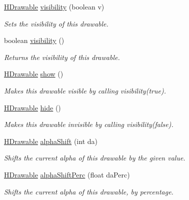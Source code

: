 \begin{DoxyCompactItemize}
\hyperlink{classhype_1_1drawable_1_1_h_drawable}{H\-Drawable} \hyperlink{classhype_1_1drawable_1_1_h_drawable_a6417fd46b70ffc329969f6c492f652e4}{visibility} (boolean v)
\begin{DoxyCompactList}\small\item\em Sets the visibility of this drawable. \end{DoxyCompactList}\item 
boolean \hyperlink{classhype_1_1drawable_1_1_h_drawable_aa79392f2459864795224477e941618cc}{visibility} ()
\begin{DoxyCompactList}\small\item\em Returns the visibility of this drawable. \end{DoxyCompactList}\item 
\hyperlink{classhype_1_1drawable_1_1_h_drawable}{H\-Drawable} \hyperlink{classhype_1_1drawable_1_1_h_drawable_a5b8fa14e65c5728b24f8f3eb0c64607a}{show} ()
\begin{DoxyCompactList}\small\item\em Makes this drawable visible by calling {\ttfamily visibility(true)}. \end{DoxyCompactList}\item 
\hyperlink{classhype_1_1drawable_1_1_h_drawable}{H\-Drawable} \hyperlink{classhype_1_1drawable_1_1_h_drawable_adc8b09823e0c47cf1e72df0820dad1e3}{hide} ()
\begin{DoxyCompactList}\small\item\em Makes this drawable invisible by calling {\ttfamily visibility(false)}. \end{DoxyCompactList}\item 
\hyperlink{classhype_1_1drawable_1_1_h_drawable}{H\-Drawable} \hyperlink{classhype_1_1drawable_1_1_h_drawable_acf22a86de606bdd313d4d45e6615a6ae}{alpha\-Shift} (int da)
\begin{DoxyCompactList}\small\item\em Shifts the current alpha of this drawable by the given value. \end{DoxyCompactList}\item 
\hyperlink{classhype_1_1drawable_1_1_h_drawable}{H\-Drawable} \hyperlink{classhype_1_1drawable_1_1_h_drawable_a8a62af5b97563ca02a2b1d6824e6cc75}{alpha\-Shift\-Perc} (float da\-Perc)
\begin{DoxyCompactList}\small\item\em Shifts the current alpha of this drawable, by percentage. \end{DoxyCompactList}\item 

\end{DoxyCompactItemize}

